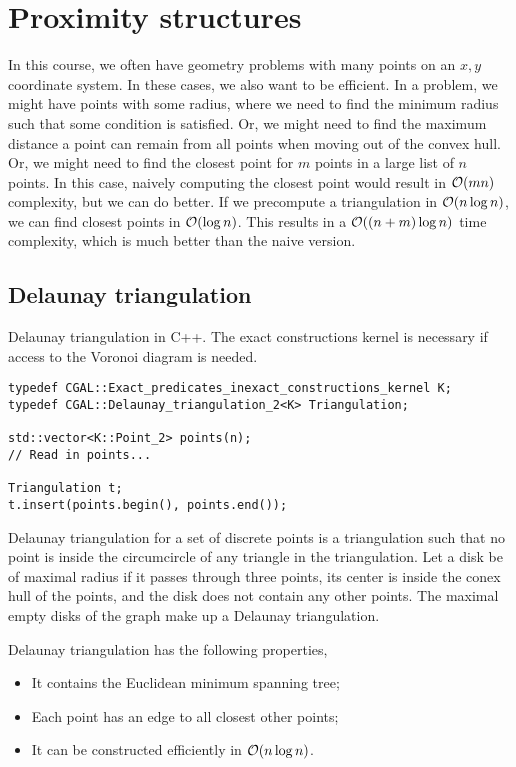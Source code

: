 \documentclass[justified,nobib]{tufte-handout}
\begin{document}
\section{Proximity structures}

In this course, we often have geometry problems with many points on an $x,y$
coordinate system. In these cases, we also want to be efficient. In a problem,
we might have points with some radius, where we need to find the minimum radius
such that some condition is satisfied. Or, we might need to find the maximum
distance a point can remain from all points when moving out of the convex hull.
Or, we might need to find the closest point for $m$ points in a large list of
$n$ points. In this case, naively computing the closest point would result in
$\bigo{mn}$ complexity, but we can do better. If we precompute a triangulation
in $\bigo{n \log n}$, we can find closest points in $\bigo{\log n}$. This
results in a $\bigo{(n+m) \log n}$ time complexity, which is much better than
the naive version.

\subsection{Delaunay triangulation}

\begin{listing}
  \caption{Delaunay triangulation in C++. The exact constructions kernel is
  necessary if access to the Voronoi diagram is needed.}
  \label{lst:dt}

  \begin{lstlisting}
typedef CGAL::Exact_predicates_inexact_constructions_kernel K;
typedef CGAL::Delaunay_triangulation_2<K> Triangulation;

std::vector<K::Point_2> points(n);
// Read in points...

Triangulation t;
t.insert(points.begin(), points.end());
  \end{lstlisting}
\end{listing}

Delaunay triangulation for a set of discrete points is a triangulation such
that no point is inside the circumcircle of any triangle in the triangulation.
Let a disk be of maximal radius if it passes through three points, its center
is inside the conex hull of the points, and the disk does not contain any other
points. The maximal empty disks of the graph make up a Delaunay triangulation.

Delaunay triangulation has the following properties,
\begin{itemize}
  \item It contains the Euclidean minimum spanning tree;
  \item Each point has an edge to all closest other points;
  \item It can be constructed efficiently in $\bigo{n \log n}$.
\end{itemize}
\end{document}
